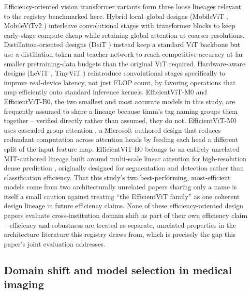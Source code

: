 \documentclass[runningheads]{llncs}
\begin{document}
Efficiency-oriented vision transformer variants form three loose lineages
relevant to the registry benchmarked here. Hybrid local--global designs
(MobileViT \cite{mehta2022mobilevit}, MobileViTv2
\cite{mehta2022mobilevitv2}) interleave convolutional stages with
transformer blocks to keep early-stage compute cheap while retaining
global attention at coarser resolutions. Distillation-oriented designs
(DeiT \cite{touvron2021deit}) instead keep a standard ViT backbone but use
a distillation token and teacher network to reach competitive accuracy at
far smaller pretraining-data budgets than the original ViT
\cite{dosovitskiy2021vit} required. Hardware-aware designs (LeViT
\cite{graham2021levit}, TinyViT \cite{wu2022tinyvit}) reintroduce
convolutional stages specifically to improve real-device latency, not
just FLOP count, by favoring operations that map efficiently onto
standard inference kernels. EfficientViT-M0 and EfficientViT-B0, the two
smallest and most accurate models in this study, are frequently assumed to
share a lineage because timm's tag naming groups them together --
verified directly rather than assumed, they do not. EfficientViT-M0 uses
cascaded group attention \cite{liu2023efficientvit}, a Microsoft-authored
design that reduces redundant computation across attention heads by
feeding each head a different split of the input feature map.
EfficientViT-B0 belongs to an entirely unrelated MIT-authored lineage
built around multi-scale linear attention for high-resolution dense
prediction \cite{cai2023efficientvit}, originally designed for
segmentation and detection rather than classification efficiency. That
this study's two best-performing, most-efficient models come from two
architecturally unrelated papers sharing only a name is itself a small
caution against treating ``the EfficientViT family'' as one coherent
design lineage in future efficiency claims. None
of these efficiency-oriented design papers evaluate cross-institution
domain shift as part of their own efficiency claim -- efficiency and
robustness are treated as separate, unrelated properties in the
architecture literature this registry draws from, which is precisely the
gap this paper's joint evaluation addresses.

\subsection{Domain shift and model selection in medical imaging}
\end{document}
